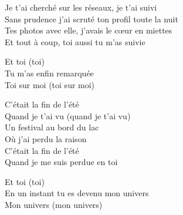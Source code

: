 \begin{lyrics}
Je t’ai cherché sur les réseaux, je t’ai suivi\\
Sans prudence j’ai scruté ton profil toute la nuit\\
Tes photos avec elle, j’avais le cœur en miettes\\
Et tout à coup, toi aussi tu m’as suivie

Et toi (toi)\\
Tu m’as enfin remarquée\\
Toi sur moi (toi sur moi)

C’était la fin de l’été\\
Quand je t’ai vu (quand je t’ai vu)\\
Un festival au bord du lac\\
Où j’ai perdu la raison\\
C’était la fin de l’été\\
Quand je me suis perdue en toi

Et toi (toi)\\
En un instant tu es devenu mon univers\\
Mon univers (mon univers)
\end{lyrics}

